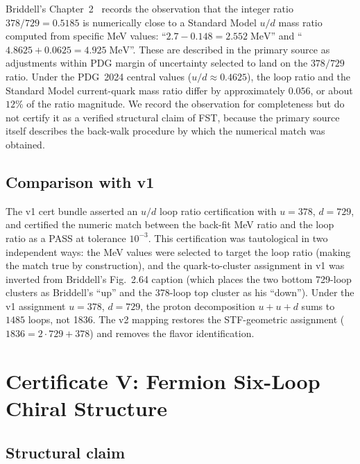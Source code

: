 \documentclass[12pt,a4paper]{article}
\begin{document}
Briddell's Chapter~2~\cite[lines 1313--1326]{briddellbook2020}
records the observation that the integer ratio $378 / 729 = 0.5185$
is numerically close to a Standard Model $u/d$ mass ratio
computed from specific MeV values: ``$2.7 - 0.148 = 2.552\;\mathrm{MeV}$''
and ``$4.8625 + 0.0625 = 4.925\;\mathrm{MeV}$''. These
are described in the primary source as adjustments within PDG margin
of uncertainty selected to land on the $378/729$ ratio. Under the
PDG~2024 central values ($u/d \approx 0.4625$), the loop ratio and
the Standard Model current-quark mass ratio differ by approximately
$0.056$, or about $12\%$ of the ratio magnitude. We record the
observation for completeness but do not certify it as a verified
structural claim of FST, because the primary source itself describes
the back-walk procedure by which the numerical match was obtained.

\subsection{Comparison with v1}

The v1 cert bundle asserted an $u/d$ loop ratio certification with
$u = 378$, $d = 729$, and certified the numeric match between the
back-fit MeV ratio and the loop ratio as a PASS at tolerance $10^{-3}$.
This certification was tautological in two independent ways: the MeV
values were selected to target the loop ratio (making the match true
by construction), and the quark-to-cluster assignment in v1 was
inverted from Briddell's Fig.~2.64 caption (which places the two
bottom 729-loop clusters as Briddell's ``up'' and the 378-loop top
cluster as his ``down''). Under the v1 assignment $u = 378$, $d = 729$,
the proton decomposition $u + u + d$ sums to $1485$ loops, not 1836.
The v2 mapping restores the STF-geometric assignment ($1836 = 2 \cdot 729
+ 378$) and removes the flavor identification.


\section{Certificate V: Fermion Six-Loop Chiral Structure}
\label{sec:cert5}

\subsection{Structural claim}
\end{document}
